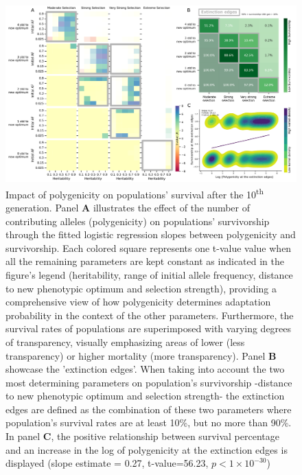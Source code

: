 \documentclass{article}
\begin{document}
\begin{figure}[H]
    \centering
    \includegraphics[width=1\textwidth]{figures/poly_survivalship_value_edges.pdf}
    \caption{Impact of polygenicity on populations' survival after the 10\textsuperscript{th} generation. Panel \textbf{A} illustrates the effect of the number of contributing alleles (polygenicity) on populations' survivorship through the fitted logistic regression slopes between polygenicity and survivorship. Each colored square represents one t-value value when all the remaining parameters are kept constant as indicated in the figure's legend (heritability, range of initial allele frequency, distance to new phenotypic optimum and selection strength), providing a comprehensive view of how polygenicity determines adaptation probability in the context of the other parameters. Furthermore,  the survival rates of populations are superimposed with varying degrees of transparency, visually emphasizing areas of lower (less transparency) or higher mortality (more transparency). Panel \textbf{B} showcase the 'extinction edges'. When taking into account the two most determining parameters on population's survivorship -distance to new phenotypic optimum and selection strength- the extinction edges are defined as the combination of these two parameters where population's survival rates are at least 10\%, but no more than 90\%. In panel \textbf{C}, the positive relationship between survival percentage and an increase in the log of polygenicity at the extinction edges is displayed (slope estimate = 0.27, t-value=56.23,  $p<1 \times 10^{-30}$)}
    \label{fig:poly_panel_figure}
\end{figure}
\end{document}
